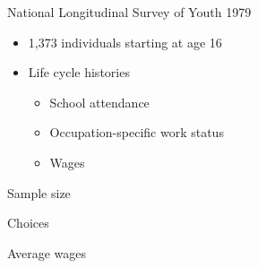\begin{frame}{National Longitudinal Survey of Youth 1979}\vspace{0.25cm}

	\begin{itemize}\setlength\itemsep{1em}
	\item 1,373 individuals starting at age 16
	\item Life cycle histories\medskip
	\begin{itemize}\setlength\itemsep{1em}
		\item School attendance
		\item Occupation-specific work status
		\item Wages
	\end{itemize}
\end{itemize}
\end{frame}
\begin{frame}{Sample size}
  \begin{figure}
  \end{figure}
\end{frame}
\begin{frame}{Choices}
  \begin{figure}
  \end{figure}
\end{frame}
\begin{frame}{Average wages}
  \begin{figure}
  \end{figure}
\end{frame}
